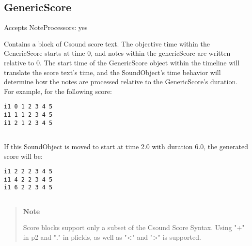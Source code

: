 \subsection{GenericScore}\label{genericScore}

Accepts NoteProcessors: yes

Contains a block of Csound score text. The objective time within the
GenericScore starts at time 0, and notes within the genericScore are
written relative to 0. The start time of the GenericScore object within
the timeline will translate the score text's time, and the SoundObject's
time behavior will determine how the notes are processed relative to the
GenericScore's duration. For example, for the following score:

\begin{verbatim}
i1 0 1 2 3 4 5
i1 1 1 2 3 4 5
i1 2 1 2 3 4 5
  
\end{verbatim}

If this SoundObject is moved to start at time 2.0 with duration 6.0, the
generated score will be:

\begin{verbatim}
i1 2 2 2 3 4 5
i1 4 2 2 3 4 5
i1 6 2 2 3 4 5
  
\end{verbatim}

\begin{quote}
\textbf{Note}

Score blocks support only a subset of the Csound Score Syntax. Using "+"
in p2 and "." in pfields, as well as "\textless{}" and "\textgreater{}"
is supported.
\end{quote}
